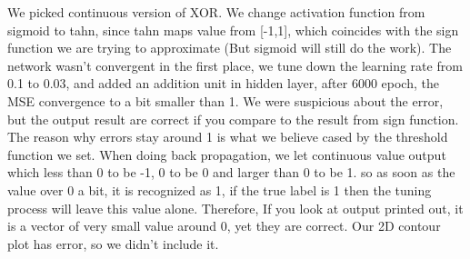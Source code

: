 \documentclass[a4paper]{article}
\begin{document}
We picked continuous version of XOR. We change activation function from sigmoid to tahn, since tahn maps value from [-1,1], which coincides with the sign function we are trying to approximate (But sigmoid will still do the work). The network wasn't convergent in the first place, we tune down the learning rate from 0.1 to 0.03, and added an addition unit in hidden layer, after 6000 epoch, the MSE convergence to a bit smaller than 1. We were suspicious about the error, but the output result are correct if you compare to the result from sign function. The reason why errors stay around 1 is what we believe cased by the threshold function we set. When doing back propagation, we let continuous value output which less than 0 to be -1, 0 to be 0 and larger than 0 to be 1. so as soon as the value over 0 a bit, it is recognized as 1, if the true label is 1 then the tuning process will leave this value alone. Therefore, If you look at output printed out, it is a vector of very small value around 0, yet they are correct. Our 2D contour plot has error, so we didn't include it.\\
\end{document}
